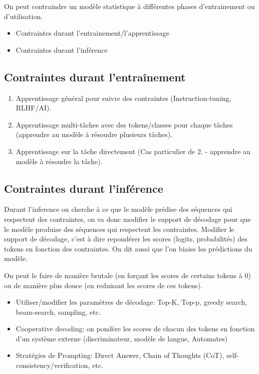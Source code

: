 \documentclass[9pt]{article}
\providecommand{\tightlist}{%
  \setlength{\itemsep}{0pt}\setlength{\parskip}{0pt}}
\begin{document}
On peut contraindre un modèle statistique à différentes phases
d'entrainement ou d'utilisation.

\begin{itemize}
    \tightlist
    \item Contraintes durant l'entrainement/l'apprentissage
    \item Contraintes durant l'inférence
\end{itemize}

\subsection{Contraintes durant l'entraînement}\label{contraintes-durant-lentrauxeenement}

\begin{enumerate}
    \def\labelenumi{\arabic{enumi}.}
    \tightlist
    \item Apprentissage général pour suivre des contraintes (Instruction-tuning, RLHF/AI).
    \item Apprentissage multi-tâches avec des tokens/classes pour chaque tâches (apprendre au modèle à résoudre plusieurs tâches).
    \item Apprentissage sur la tâche directement (Cas particulier de 2. - apprendre au modèle à résoudre la tâche).
\end{enumerate}

\subsection{Contraintes durant l'inférence}\label{contraintes-durant-linfuxe9rence}

Durant l'inference on cherche à ce que le modèle prédise des séquences qui respectent des contraintes, on va donc modifier le support de décodage pour que le modèle produise des séquences qui respectent les contraintes.
Modifier le support de décodage, c'est à dire repondérer les scores (logits, probabilités) des tokens en fonction des contraintes.
On dit aussi que l'on biaise les prédictions du modèle.

On peut le faire de manière brutale (en forçant les scores de certains tokens à 0) ou de manière plus douce (en reduisant les scores de ces tokens). 

\begin{itemize}
    \tightlist
    \item Utiliser/modifier les paramètres de décodage: Top-K, Top-p, greedy search, beam-search\cite{anderson2017guidedopenvocabularyimage,post2018fastlexicallyconstraineddecoding,hu-etal-2019-improved,li2021guidedgenerationcauseeffect}, sampling, etc.
    \item Cooperative decoding: on pondère les scores de chacun des tokens en fonction d'un système externe (discriminateur\cite{krause2020gedigenerativediscriminatorguided,dathathri2020plugplaylanguagemodels}, modèle de langue\cite{liu2024tuninglanguagemodelsproxy,Shi2024DecodingTimeLM,Fan2024OnGS}, Automates\cite{})
    \item Stratégies de Prompting: Direct Answer, Chain of Thoughts (CoT), self-consistency/verification, etc.
\end{itemize}
\end{document}
